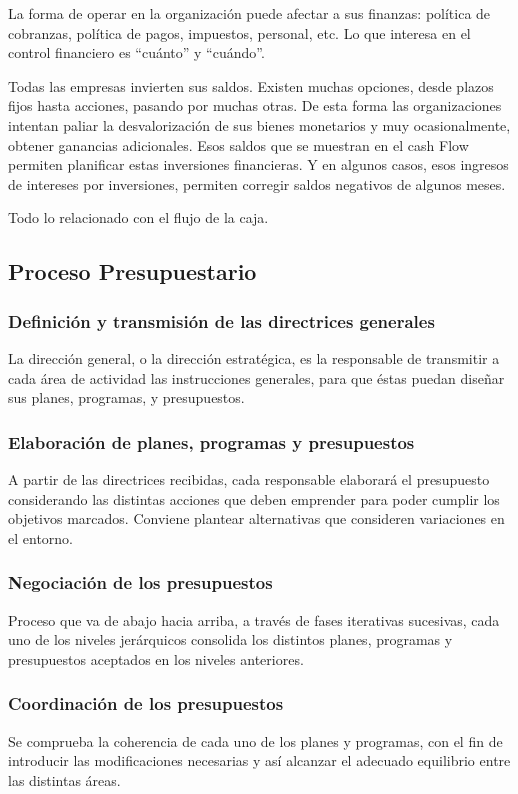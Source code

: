 \documentclass[titlepage,a4paper]{article}
\begin{document}
La forma de operar en la organización puede afectar a sus finanzas: política de cobranzas, 
política de pagos, impuestos, personal, etc. Lo que interesa en el control financiero es “cuánto” y “cuándo”.

Todas las empresas invierten sus saldos. Existen muchas opciones, desde plazos fijos hasta acciones, 
pasando por muchas otras. De esta forma las organizaciones intentan paliar la desvalorización de sus bienes 
monetarios y muy ocasionalmente, obtener ganancias adicionales. Esos saldos que se muestran en el cash 
Flow permiten planificar estas inversiones financieras. Y en algunos casos, esos ingresos de intereses por 
inversiones, permiten corregir saldos negativos de algunos meses.

Todo lo relacionado con el flujo de la caja.


\subsection{Proceso Presupuestario}

\subsubsection*{Definición y transmisión de las directrices generales}
La dirección general, o la dirección estratégica, es la responsable de transmitir a cada área de actividad 
las instrucciones generales, para que éstas puedan diseñar sus planes, programas, y presupuestos.


\subsubsection*{Elaboración de planes, programas y presupuestos}
A partir de las directrices recibidas, cada responsable elaborará el presupuesto considerando las distintas 
acciones que deben emprender para poder cumplir los objetivos marcados. Conviene plantear alternativas que consideren variaciones en el entorno.

\subsubsection*{Negociación de los presupuestos}
Proceso que va de abajo hacia arriba, a través de fases iterativas sucesivas, cada uno de los niveles 
jerárquicos consolida los distintos planes, programas y presupuestos aceptados en los niveles anteriores.

\subsubsection*{Coordinación de los presupuestos}
Se comprueba la coherencia de cada uno de los planes y programas, con el fin de introducir las 
modificaciones necesarias y así alcanzar el adecuado equilibrio entre las distintas áreas.
\end{document}
